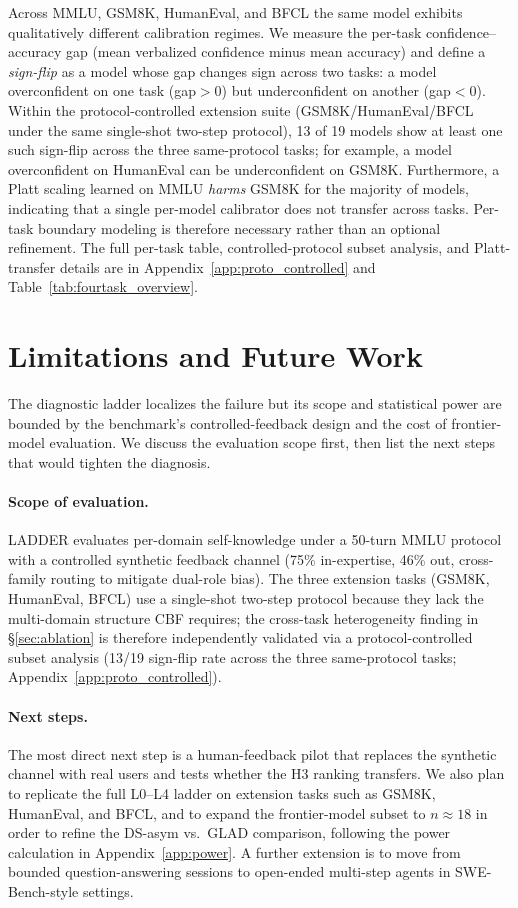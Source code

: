 \documentclass[11pt]{article}
\begin{document}
Across MMLU, GSM8K, HumanEval, and BFCL the same model exhibits qualitatively different calibration regimes. We measure the per-task confidence--accuracy gap (mean verbalized confidence minus mean accuracy) and define a \emph{sign-flip} as a model whose gap changes sign across two tasks: a model overconfident on one task (gap${>}0$) but underconfident on another (gap${<}0$). Within the protocol-controlled extension suite (GSM8K/HumanEval/BFCL under the same single-shot two-step protocol), 13 of 19 models show at least one such sign-flip across the three same-protocol tasks; for example, a model overconfident on HumanEval can be underconfident on GSM8K. Furthermore, a Platt scaling learned on MMLU \emph{harms} GSM8K for the majority of models, indicating that a single per-model calibrator does not transfer across tasks. Per-task boundary modeling is therefore necessary rather than an optional refinement. The full per-task table, controlled-protocol subset analysis, and Platt-transfer details are in Appendix~\ref{app:proto_controlled} and Table~\ref{tab:fourtask_overview}.

\section{Limitations and Future Work}
\label{sec:limitations}

The diagnostic ladder localizes the failure but its scope and statistical power are bounded by the benchmark's controlled-feedback design and the cost of frontier-model evaluation. We discuss the evaluation scope first, then list the next steps that would tighten the diagnosis.

\paragraph{Scope of evaluation.} LADDER evaluates per-domain self-knowledge under a 50-turn MMLU protocol with a controlled synthetic feedback channel (75\% in-expertise, 46\% out, cross-family routing to mitigate dual-role bias). The three extension tasks (GSM8K, HumanEval, BFCL) use a single-shot two-step protocol because they lack the multi-domain structure CBF requires; the cross-task heterogeneity finding in \S\ref{sec:ablation} is therefore independently validated via a protocol-controlled subset analysis (13/19 sign-flip rate across the three same-protocol tasks; Appendix~\ref{app:proto_controlled}).

\paragraph{Next steps.} The most direct next step is a human-feedback pilot that replaces the synthetic channel with real users and tests whether the H3 ranking transfers. We also plan to replicate the full L0--L4 ladder on extension tasks such as GSM8K, HumanEval, and BFCL, and to expand the frontier-model subset to $n\!\approx\!18$ in order to refine the DS-asym vs.\ GLAD comparison, following the power calculation in Appendix~\ref{app:power}. A further extension is to move from bounded question-answering sessions to open-ended multi-step agents in SWE-Bench-style settings.
\end{document}
